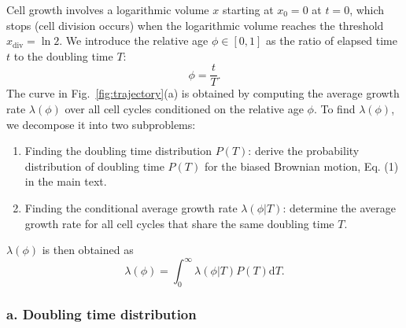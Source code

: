 \documentclass[aps, prl, longbibliography, linenumbers, superscriptaddress]{revtex4-2}
\begin{document}
Cell growth involves a logarithmic volume $x$ starting at $x_0 = 0$ at $t=0$, which stops (cell division occurs) when the logarithmic volume reaches the threshold $x_{\text{div}} = \ln2$. We introduce the relative age $\phi \in [0, 1]$ as the ratio of elapsed time $t$ to the doubling time $T$:
\begin{equation}
	\phi = \frac{t}{T}.
\end{equation}
The curve in Fig.~\ref{fig:trajectory}(a) is obtained by computing the average growth rate $\lambda(\phi)$ over all cell cycles conditioned on the relative age $\phi$. To find $\lambda(\phi)$, we decompose it into two subproblems:
\begin{enumerate}
	\item Finding the doubling time distribution $P(T)$: derive the probability distribution of doubling time $P(T)$ for the biased Brownian motion, Eq. (1) in the main text.
	\item Finding the conditional average growth rate $\lambda(\phi | T)$: determine the average growth rate for all cell cycles that share the same doubling time $T$.
\end{enumerate}
${\lambda(\phi)}$ is then obtained as
\begin{equation}
	\lambda(\phi) = \int_0^\infty \lambda(\phi | T) P(T) \mathrm{d}T.
\end{equation}

\subsubsection{a. Doubling time distribution}
\end{document}
